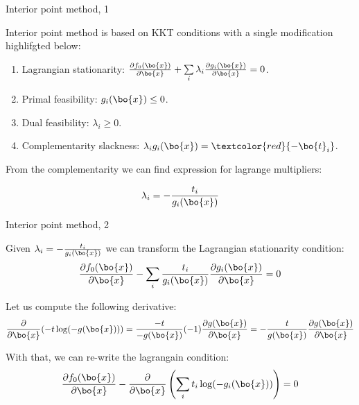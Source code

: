 \documentclass{beamer}
\begin{document}
\begin{frame}{Interior point method, 1}
	\begin{flushleft}
		
		Interior point method is based on KKT conditions with a single modification highlifgted below:
		
		\begin{enumerate}
			\item Lagrangian stationarity: $\frac{\partial f_0(\bo{x}) }{\partial \bo{x}} 
			+
			\sum\limits_i 
			\lambda_i  \frac{\partial g_i(\bo{x}) }{\partial \bo{x}} 
			= 0$.
			
			\item Primal feasibility: $g_i(\bo{x}) \leq 0$.
			
			\item Dual feasibility: $\lambda_i \geq 0$.
			
			\item Complementarity slackness: $\lambda_i g_i(\bo{x}) = \textcolor{red}{-\bo{t}_i}$.
		\end{enumerate}
		
		\bigskip
		
		From the complementarity we can find expression for lagrange multipliers:
		
		\begin{equation}
			\lambda_i = -\frac{t_i}{g_i(\bo{x})}
		\end{equation}
		
	\end{flushleft}
\end{frame}




\begin{frame}{Interior point method, 2}
	\begin{flushleft}
		
		Given $\lambda_i = -\frac{t_i}{g_i(\bo{x})}$ we can transform the Lagrangian stationarity condition:
		\begin{equation}
			\frac{\partial f_0(\bo{x})}{\partial \bo{x}} 
			-
			\sum\limits_i 
			\frac{t_i}{g_i(\bo{x})}
			\frac{\partial g_i(\bo{x})}{\partial \bo{x}} 
			= 0
		\end{equation}
		
		Let us compute the following derivative:
		\begin{align}
			\frac{\partial}{\partial \bo{x}} (  -t \log ( -g(\bo{x}) )  ) 
			= \frac{-t}{-g(\bo{x})} (-1) \frac{\partial g(\bo{x})}{\partial \bo{x}} 
			= -\frac{t}{g(\bo{x})} \frac{\partial g(\bo{x})}{\partial \bo{x}} 
		\end{align}
		
		With that, we can re-write the lagrangain condition:
		\begin{equation}
			\frac{\partial f_0(\bo{x})}{\partial \bo{x}} 
			-
			\frac{\partial}{\partial \bo{x}} 
			\left(
			\sum\limits_i 
			t_i \log (- g_i (\bo{x})) 
			\right) = 0
		\end{equation}
		
		
	\end{flushleft}
\end{frame}
\end{document}
